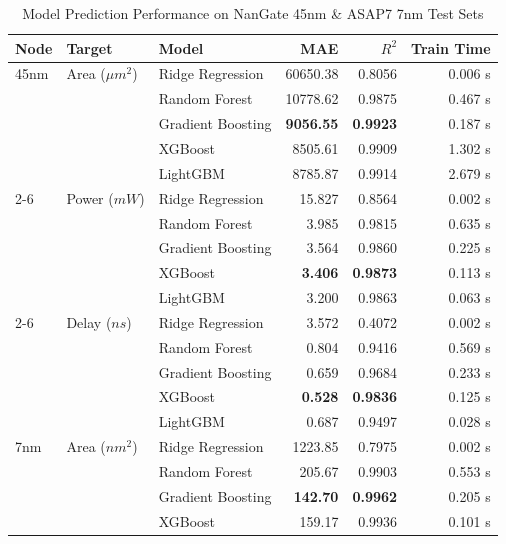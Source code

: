 \documentclass[conference]{IEEEtran}
\begin{document}
\begin{table}[h]
\centering
\caption{Model Prediction Performance on NanGate 45nm \& ASAP7 7nm Test Sets}
\label{tab:results}
\begin{tabular}{lllrrr}
\toprule
\textbf{Node} & \textbf{Target} & \textbf{Model} & \textbf{MAE} & \textbf{$R^2$} & \textbf{Train Time} \\
\midrule
45nm & Area ($\mu m^2$) & Ridge Regression & 60650.38 & 0.8056 & 0.006 s \\
     &                  & Random Forest & 10778.62  & 0.9875 & 0.467 s \\
     &                  & Gradient Boosting & \textbf{9056.55} & \textbf{0.9923} & 0.187 s \\
     &                  & XGBoost & 8505.61  & 0.9909 & 1.302 s \\
     &                  & LightGBM & 8785.87  & 0.9914 & 2.679 s \\
\cmidrule{2-6}
     & Power ($mW$)     & Ridge Regression & 15.827 & 0.8564 & 0.002 s \\
     &                  & Random Forest & 3.985 & 0.9815 & 0.635 s \\
     &                  & Gradient Boosting & 3.564 & 0.9860 & 0.225 s \\
     &                  & XGBoost & \textbf{3.406} & \textbf{0.9873} & 0.113 s \\
     &                  & LightGBM & 3.200 & 0.9863 & 0.063 s \\
\cmidrule{2-6}
     & Delay ($ns$)     & Ridge Regression & 3.572 & 0.4072 & 0.002 s \\
     &                  & Random Forest & 0.804 & 0.9416 & 0.569 s \\
     &                  & Gradient Boosting & 0.659 & 0.9684 & 0.233 s \\
     &                  & XGBoost & \textbf{0.528} & \textbf{0.9836} & 0.125 s \\
     &                  & LightGBM & 0.687 & 0.9497 & 0.028 s \\
\midrule
7nm  & Area ($nm^2$)  & Ridge Regression & 1223.85 & 0.7975 & 0.002 s \\
     &                  & Random Forest & 205.67  & 0.9903 & 0.553 s \\
     &                  & Gradient Boosting & \textbf{142.70} & \textbf{0.9962} & 0.205 s \\
     &                  & XGBoost & 159.17  & 0.9936 & 0.101 s \\

\end{tabular}
\end{table}
\end{document}
